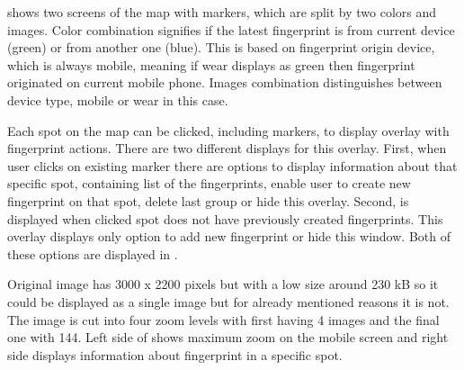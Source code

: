  shows two screens of the map with markers, which are split by two colors and images. Color combination signifies if the latest fingerprint is from current device (green) or from another one (blue). This is based on fingerprint origin device, which is always mobile, meaning if wear displays as green then fingerprint originated on current mobile phone. Images combination distinguishes between device type, mobile or wear in this case.

Each spot on the map can be clicked, including markers, to display overlay with fingerprint actions. There are two different displays for this overlay. First, when user clicks on existing marker there are options to display information about that specific spot, containing list of the fingerprints, enable user to create new fingerprint on that spot, delete last group or hide this overlay. Second, is displayed when clicked spot does not have previously created fingerprints. This overlay displays only option to add new fingerprint or hide this window. Both of these options are displayed in .

Original image has 3000 x 2200 pixels but with a low size around 230 kB so it could be displayed as a single image but for already mentioned reasons it is not. The image is cut into four zoom levels with first having 4 images and the final one with 144. Left side of  shows maximum zoom on the mobile screen and right side displays information about fingerprint in a specific spot.

